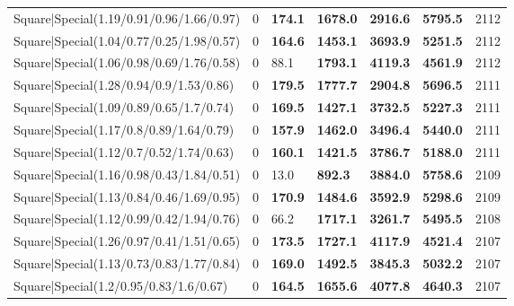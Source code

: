 \begin{tabular}{lrllllr}
 Square|Special(1.19/0.91/0.96/1.66/0.97)                      &             0   & \textbf{174.1} & \textbf{1678.0} & \textbf{2916.6} & \textbf{5795.5} &         2112 \\
 Square|Special(1.04/0.77/0.25/1.98/0.57)                      &             0   & \textbf{164.6} & \textbf{1453.1} & \textbf{3693.9} & \textbf{5251.5} &         2112 \\
 Square|Special(1.06/0.98/0.69/1.76/0.58)                      &             0   & 88.1           & \textbf{1793.1} & \textbf{4119.3} & \textbf{4561.9} &         2112 \\
 Square|Special(1.28/0.94/0.9/1.53/0.86)                       &             0   & \textbf{179.5} & \textbf{1777.7} & \textbf{2904.8} & \textbf{5696.5} &         2111 \\
 Square|Special(1.09/0.89/0.65/1.7/0.74)                       &             0   & \textbf{169.5} & \textbf{1427.1} & \textbf{3732.5} & \textbf{5227.3} &         2111 \\
 Square|Special(1.17/0.8/0.89/1.64/0.79)                       &             0   & \textbf{157.9} & \textbf{1462.0} & \textbf{3496.4} & \textbf{5440.0} &         2111 \\
 Square|Special(1.12/0.7/0.52/1.74/0.63)                       &             0   & \textbf{160.1} & \textbf{1421.5} & \textbf{3786.7} & \textbf{5188.0} &         2111 \\
 Square|Special(1.16/0.98/0.43/1.84/0.51)                      &             0   & 13.0           & \textbf{892.3}  & \textbf{3884.0} & \textbf{5758.6} &         2109 \\
 Square|Special(1.13/0.84/0.46/1.69/0.95)                      &             0   & \textbf{170.9} & \textbf{1484.6} & \textbf{3592.9} & \textbf{5298.6} &         2109 \\
 Square|Special(1.12/0.99/0.42/1.94/0.76)                      &             0   & 66.2           & \textbf{1717.1} & \textbf{3261.7} & \textbf{5495.5} &         2108 \\
 Square|Special(1.26/0.97/0.41/1.51/0.65)                      &             0   & \textbf{173.5} & \textbf{1727.1} & \textbf{4117.9} & \textbf{4521.4} &         2107 \\
 Square|Special(1.13/0.73/0.83/1.77/0.84)                      &             0   & \textbf{169.0} & \textbf{1492.5} & \textbf{3845.3} & \textbf{5032.2} &         2107 \\
 Square|Special(1.2/0.95/0.83/1.6/0.67)                        &             0   & \textbf{164.5} & \textbf{1655.6} & \textbf{4077.8} & \textbf{4640.3} &         2107 \\

\end{tabular}
